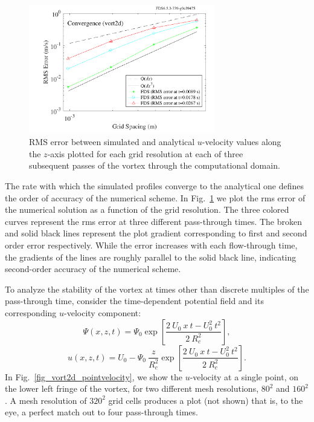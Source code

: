 \documentclass[11pt]{book}
\begin{document}
\begin{figure}[h!]
   \centering
    \includegraphics[width=3.2in]{SCRIPT_FIGURES/vort2d_error}
    \caption[Convergence study for the  test case]{RMS error between simulated and analytical $u$-velocity values along the $z$-axis plotted for each grid resolution at each of three subsequent passes of the vortex through the computational domain.}
    \label{fig_vort2d_error}
\end{figure}

The rate with which the simulated profiles converge to the analytical one defines the order of accuracy of the numerical scheme. In Fig.~\ref{fig_vort2d_error} we plot the rms error of the numerical solution as a function of the grid resolution. The three colored curves represent the rms error at three different pass-through times. The broken and solid black lines represent the plot gradient corresponding to first and second order error respectively. While the error increases with each flow-through time, the gradients of the lines are roughly parallel to the solid black line, indicating second-order accuracy of the numerical scheme.

To analyze the stability of the vortex at times other than discrete multiples of the pass-through time, consider the time-dependent potential field and its corresponding $u$-velocity component:
\begin{equation}
\label{eqn_vort2d_timedep}
\Psi (x,z,t) = \Psi_{0} \exp \left[\frac{2 \ U_{0} \ x \ t - U_{0}^{2} \ t^{2}}{2 \ R_{c}^{2}} \right],
\end{equation}
\begin{equation}
\label{eqn_uvel_timedep}
u (x,z,t) = U_{0} - \Psi_{0} \ \frac{z}{R_{c}^{2}} \exp \left[\frac{2 \ U_{0} \ x \ t - U_{0}^{2} \ t^{2}}{2 \ R_{c}^{2}} \right].
\end{equation}
In Fig.~\ref{fig_vort2d_pointvelocity}, we show the $u$-velocity at a single point, on the lower left fringe of the vortex, for two different mesh resolutions, $80^{2}$ and $160^{2}$. A mesh resolution of $320^{2}$ grid cells produces a plot (not shown) that is, to the eye, a perfect match out to four pass-through times.
\end{document}
